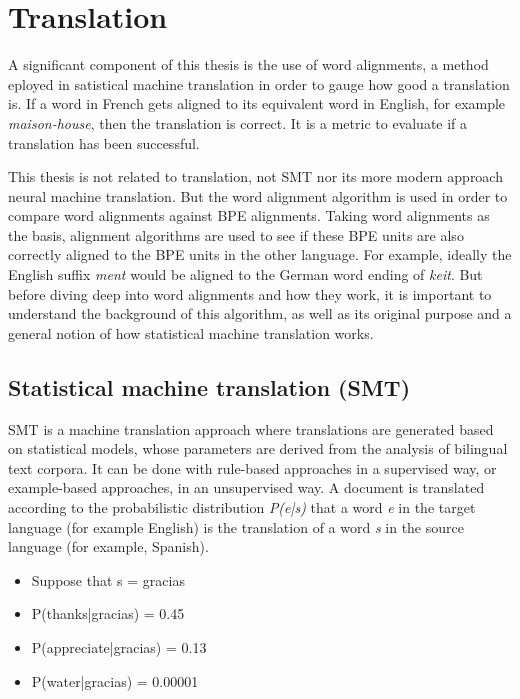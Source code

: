 %
%

\section{Translation}\label{ch:translation}

A significant component of this thesis is the use of word alignments, a method eployed in satistical machine translation in order to gauge how good a translation is. If a word in French gets aligned to its equivalent word in English, for example \emph{maison-house}, then the translation is correct. It is a metric to evaluate if a translation has been successful.

This thesis is not related to translation, not SMT nor its more modern approach neural machine translation. But the word alignment algorithm is used in order to compare word alignments against BPE alignments. Taking word alignments as the basis, alignment algorithms are used to see if these BPE units are also correctly aligned to the BPE units in the other language. For example, ideally the English suffix \emph{ment} would be aligned to the German word ending of \emph{keit}. But before diving deep into word alignments and how they work, it is important to understand the background of this algorithm, as well as its original purpose and a general notion of how statistical machine translation works.

\subsection{Statistical machine translation (SMT)}

SMT is a machine translation approach where translations are generated based on statistical models, whose parameters are derived from the analysis of bilingual text corpora. It can be done with rule-based approaches in a supervised way, or example-based approaches, in an unsupervised way. A document is translated according to the probabilistic distribution \emph{P(e|s)} that a word \emph{e} in the target language (for example English) is the translation of a word \emph{s} in the source language (for example, Spanish).

\begin{itemize}
	\item Suppose that s = gracias
	\item P(thanks|gracias) = 0.45
	\item P(appreciate|gracias) = 0.13
	\item P(water|gracias) = 0.00001
\end{itemize}

